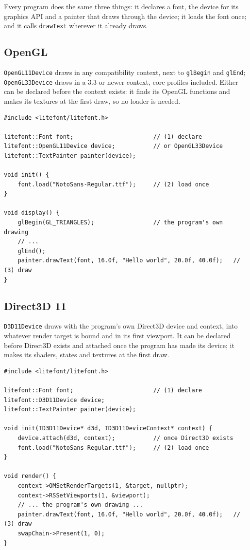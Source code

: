 \documentclass[11pt]{article}
\begin{document}
Every program does the same three things: it declares a font, the device for its graphics API and a painter that draws through the device; it loads the font once; and it calls \texttt{drawText} wherever it already draws.

\subsection*{OpenGL}

\texttt{OpenGL11Device} draws in any compatibility context, next to \texttt{glBegin} and \texttt{glEnd}; \texttt{OpenGL33Device} draws in a 3.3 or newer context, core profiles included. Either can be declared before the context exists: it finds its OpenGL functions and makes its textures at the first draw, so no loader is needed.

\begin{lstlisting}
#include <litefont/litefont.h>

litefont::Font font;                       // (1) declare
litefont::OpenGL11Device device;           // or OpenGL33Device
litefont::TextPainter painter(device);

void init() {
	font.load("NotoSans-Regular.ttf");     // (2) load once
}

void display() {
	glBegin(GL_TRIANGLES);                 // the program's own drawing
	// ...
	glEnd();
	painter.drawText(font, 16.0f, "Hello world", 20.0f, 40.0f);   // (3) draw
}
\end{lstlisting}

\subsection*{Direct3D 11}

\texttt{D3D11Device} draws with the program's own Direct3D device and context, into whatever render target is bound and in its first viewport. It can be declared before Direct3D exists and attached once the program has made its device; it makes its shaders, states and textures at the first draw.

\begin{lstlisting}
#include <litefont/litefont.h>

litefont::Font font;                       // (1) declare
litefont::D3D11Device device;
litefont::TextPainter painter(device);

void init(ID3D11Device* d3d, ID3D11DeviceContext* context) {
	device.attach(d3d, context);           // once Direct3D exists
	font.load("NotoSans-Regular.ttf");     // (2) load once
}

void render() {
	context->OMSetRenderTargets(1, &target, nullptr);
	context->RSSetViewports(1, &viewport);
	// ... the program's own drawing ...
	painter.drawText(font, 16.0f, "Hello world", 20.0f, 40.0f);   // (3) draw
	swapChain->Present(1, 0);
}
\end{lstlisting}
\end{document}
